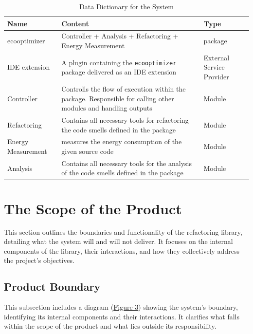 \documentclass[12pt]{article}
\begin{document}
\begin{longtable}[H]{
    >{\raggedright\arraybackslash}p{3.5cm}
    >{\raggedright\arraybackslash}p{9cm}
  >{\raggedright\arraybackslash}p{2cm}}
  \toprule
  \textbf{Name} & \textbf{Content} & \textbf{Type} \\
  \midrule
  \endhead
  \bottomrule
  \caption{Data Dictionary for the System}
  \label{tab:data-dict}
  \endlastfoot

  ecooptimizer & Controller + Analysis + Refactoring + Energy
  Measurement & package \\ \midrule
  IDE extension & A plugin containing the \texttt{ecooptimizer}
  package delivered as an IDE extension & External Service Provider \\ \midrule
  Controller & Controlls the flow of execution within the package.
  Responsible for calling other modules and handling outputs & Module
  \\ \midrule
  Refactoring & Contains all necessary tools for refactoring the code
  smells defined in the package & Module \\ \midrule
  Energy Measurement & measures the energy consumption of the given
  source code & Module \\ \midrule
  Analysis & Contains all necessary tools for the analysis of the
  code smells defined in the package & Module \\
\end{longtable}

\section{The Scope of the Product}
This section outlines the boundaries and functionality of the
refactoring library, detailing what the system will and will not
deliver. It focuses on the internal components of the library, their
interactions, and how they collectively address the project's objectives.

\subsection{Product Boundary}
This subsection includes a diagram (\hyperref[img:prod-bound]{Figure
3}) showing the system's boundary, identifying its internal
components and their interactions. It clarifies what falls within the
scope of the product and what lies outside its responsibility.
\end{document}
